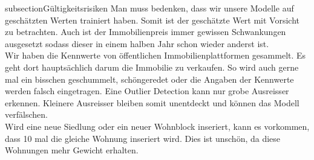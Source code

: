 subsection{Gültigkeitsrisiken}
Man muss bedenken, dass wir unsere Modelle auf geschätzten Werten trainiert haben. Somit ist der geschätzte Wert mit Vorsicht zu betrachten. Auch ist der Immobilienpreis immer gewissen Schwankungen ausgesetzt sodass dieser in einem halben Jahr schon wieder anderst ist.\\
Wir haben die Kennwerte von öffentlichen Immobilienplattformen gesammelt. Es geht dort hauptsächlich darum die Immobilie zu verkaufen. So wird auch gerne mal ein bisschen geschummelt, schöngeredet oder die Angaben der Kennwerte werden falsch eingetragen. Eine Outlier Detection kann nur grobe Ausreisser erkennen. Kleinere Ausreisser bleiben somit unentdeckt und können das Modell verfälschen.\\
Wird eine neue Siedlung oder ein neuer Wohnblock inseriert, kann es vorkommen, dass 10 mal die gleiche Wohnung inseriert wird. Dies ist unschön, da diese Wohnungen mehr Gewicht erhalten.

